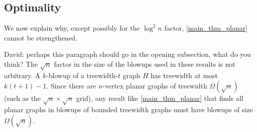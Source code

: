 \documentclass{patmorin}
\newcommand{\david}[1]{{\color{orange} David: #1}}
\newcommand{\pat}[1]{\textcolor{Blue}{Pat: #1}}
\DeclareMathOperator{\polylog}{polylog}
\begin{document}
\subsection{Optimality}

We now explain why, except possibly for the $\log^2 n$ factor, \cref{main_thm_planar} cannot be strengthened.

\david{perhaps this paragraph should go in the opening subsection, what do you think?} The $\sqrt{n}$ factor in the size of the blowups used in these results is not arbitrary. A $k$-blowup of a treewidth-$t$ graph $H$ has treewidth at most $k(t+1)-1$.  Since there are $n$-vertex planar graphs of treewidth $\Omega(\sqrt{n})$ (such as the $\sqrt{n}\times\sqrt{n}$ grid), any result like \cref{main_thm_planar} that finds all planar graphs in blowups of bounded treewidth graphs must have blowups of size $\Omega(\sqrt{n})$.



\end{document}
